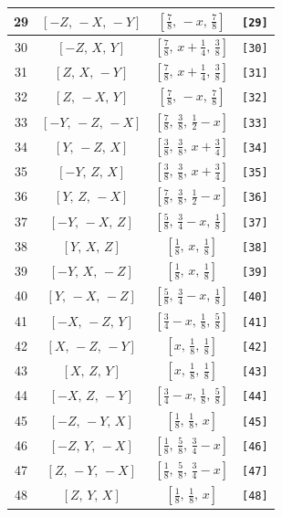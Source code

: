 \documentclass[fleqn,8pt]{jsarticle}
\begin{document}
\begin{longtable}{cccc}
29 & $\left[ - Z,\, - X,\, - Y \right]$ & $\left[ \frac{7}{8},\, - x,\, \frac{7}{8} \right]$ & {\tt [29]} \\ \hline
30 & $\left[ - Z,\, X,\, Y \right]$ & $\left[ \frac{7}{8},\, x + \frac{1}{4},\, \frac{3}{8} \right]$ & {\tt [30]} \\ \hline
31 & $\left[ Z,\, X,\, - Y \right]$ & $\left[ \frac{7}{8},\, x + \frac{1}{4},\, \frac{3}{8} \right]$ & {\tt [31]} \\ \hline
32 & $\left[ Z,\, - X,\, Y \right]$ & $\left[ \frac{7}{8},\, - x,\, \frac{7}{8} \right]$ & {\tt [32]} \\ \hline
33 & $\left[ - Y,\, - Z,\, - X \right]$ & $\left[ \frac{7}{8},\, \frac{3}{8},\, \frac{1}{2} - x \right]$ & {\tt [33]} \\ \hline
34 & $\left[ Y,\, - Z,\, X \right]$ & $\left[ \frac{3}{8},\, \frac{3}{8},\, x + \frac{3}{4} \right]$ & {\tt [34]} \\ \hline
35 & $\left[ - Y,\, Z,\, X \right]$ & $\left[ \frac{3}{8},\, \frac{3}{8},\, x + \frac{3}{4} \right]$ & {\tt [35]} \\ \hline
36 & $\left[ Y,\, Z,\, - X \right]$ & $\left[ \frac{7}{8},\, \frac{3}{8},\, \frac{1}{2} - x \right]$ & {\tt [36]} \\ \hline
37 & $\left[ - Y,\, - X,\, Z \right]$ & $\left[ \frac{5}{8},\, \frac{3}{4} - x,\, \frac{1}{8} \right]$ & {\tt [37]} \\ \hline
38 & $\left[ Y,\, X,\, Z \right]$ & $\left[ \frac{1}{8},\, x,\, \frac{1}{8} \right]$ & {\tt [38]} \\ \hline
39 & $\left[ - Y,\, X,\, - Z \right]$ & $\left[ \frac{1}{8},\, x,\, \frac{1}{8} \right]$ & {\tt [39]} \\ \hline
40 & $\left[ Y,\, - X,\, - Z \right]$ & $\left[ \frac{5}{8},\, \frac{3}{4} - x,\, \frac{1}{8} \right]$ & {\tt [40]} \\ \hline
41 & $\left[ - X,\, - Z,\, Y \right]$ & $\left[ \frac{3}{4} - x,\, \frac{1}{8},\, \frac{5}{8} \right]$ & {\tt [41]} \\ \hline
42 & $\left[ X,\, - Z,\, - Y \right]$ & $\left[ x,\, \frac{1}{8},\, \frac{1}{8} \right]$ & {\tt [42]} \\ \hline
43 & $\left[ X,\, Z,\, Y \right]$ & $\left[ x,\, \frac{1}{8},\, \frac{1}{8} \right]$ & {\tt [43]} \\ \hline
44 & $\left[ - X,\, Z,\, - Y \right]$ & $\left[ \frac{3}{4} - x,\, \frac{1}{8},\, \frac{5}{8} \right]$ & {\tt [44]} \\ \hline
45 & $\left[ - Z,\, - Y,\, X \right]$ & $\left[ \frac{1}{8},\, \frac{1}{8},\, x \right]$ & {\tt [45]} \\ \hline
46 & $\left[ - Z,\, Y,\, - X \right]$ & $\left[ \frac{1}{8},\, \frac{5}{8},\, \frac{3}{4} - x \right]$ & {\tt [46]} \\ \hline
47 & $\left[ Z,\, - Y,\, - X \right]$ & $\left[ \frac{1}{8},\, \frac{5}{8},\, \frac{3}{4} - x \right]$ & {\tt [47]} \\ \hline
48 & $\left[ Z,\, Y,\, X \right]$ & $\left[ \frac{1}{8},\, \frac{1}{8},\, x \right]$ & {\tt [48]} \\
\end{longtable}
\end{document}
